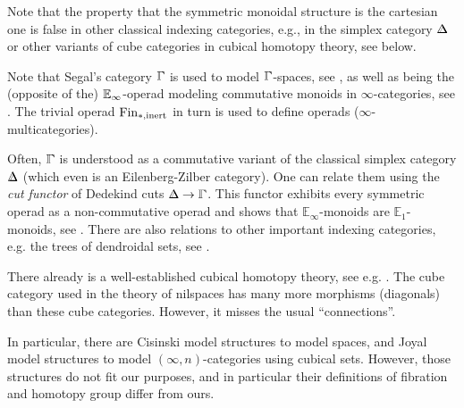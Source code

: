 \begin{remark}
Note that the property that the symmetric monoidal structure is the cartesian one
is false in other classical indexing categories, e.g., in the simplex category $\bbDelta$
or other variants of cube categories in cubical homotopy theory, see below.
\end{remark}


\begin{remark}
Note that Segal's category $\bbGamma$ is used to model $\bbGamma$-spaces,
see \cite{Bousfield1978,Brown1981,Schwede1999,Schwede2000},
as well as being the (opposite of the) $\mathbb{E}_\infty$-operad modeling commutative monoids in $\infty$-categories,
see \cite{Lurie2017,Hebestreit2021}.
The trivial operad ${\operatorname{Fin}_{\ast,\mathrm{inert}}}$ in turn is used to define operads ($\infty$-multicategories).

Often, $\bbGamma$ is understood as a commutative variant of the classical simplex category $\bbDelta$
(which even is an Eilenberg-Zilber category).
One can relate them using the \emph{cut functor} of Dedekind cuts $\bbDelta\to\bbGamma$.
This functor exhibits every symmetric operad as a non-commutative operad
and shows that $\mathbb{E}_\infty$-monoids are $\mathbb{E}_1$-monoids, see \cite{Lurie2017,Hebestreit2021}.
There are also relations to other important indexing categories,
e.g. the trees of dendroidal sets, see \cite{Cisinski2011,Heuts2022}.
\end{remark}

\begin{remark}\label{def:cubical_homotopy_cubes}
There already is a well-established cubical homotopy theory, see e.g. \cite{Brown1981,Cisinski2006,Brown2011,Doherty2024}.
The cube category used in the theory of nilspaces has many more morphisms (diagonals)
than these cube categories.
However, it misses the usual \enquote{connections}.

In particular, there are Cisinski model structures to model spaces, and Joyal model structures to model $(\infty,n)$-categories using cubical sets.
However, those structures do not fit our purposes, and in particular their definitions of fibration and homotopy group differ from ours.
\end{remark}

